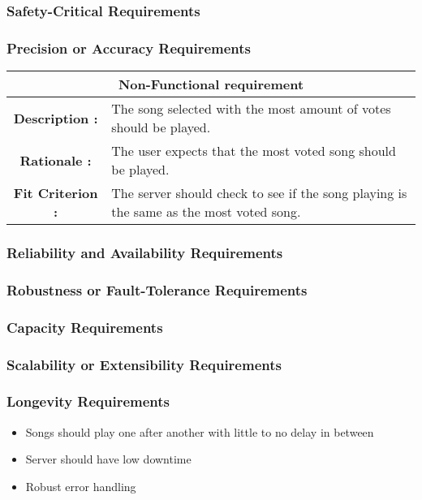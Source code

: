 \documentclass[12pt, titlepage]{article}
\begin{document}
\subsubsection{Safety-Critical Requirements}

\subsubsection{Precision or Accuracy Requirements}

\begin{center}
\begin{table}[H]
\begin{tabularx}{\textwidth}{| c X |}
\hline
\multicolumn{2}{|c|}{\textbf{Non-Functional requirement}}\\
\hline
\textbf{Description : } &The song selected with the most amount of votes should be played.\\
\hline
\textbf{Rationale : } & The user expects that the most voted song should be played.\\
\hline
\textbf{Fit Criterion : } & The server should check to see if the song playing is the same as the most voted song.\\
\hline
\end{tabularx}
\end{table}
\end{center}


\subsubsection{Reliability and Availability Requirements}
\subsubsection{Robustness or Fault-Tolerance Requirements}
\subsubsection{Capacity Requirements}
\subsubsection{Scalability or Extensibility Requirements}
\subsubsection{Longevity Requirements}
\begin{itemize}
\item Songs should play one after another with little to no delay in between
\item Server should have low downtime
\item Robust error handling
\end{itemize}
\end{document}
